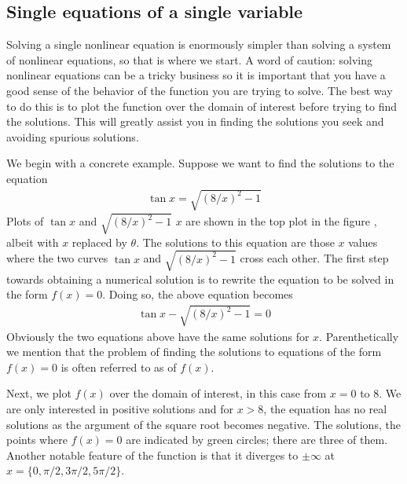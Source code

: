 \documentclass[letterpaper,10pt,english]{sphinxmanual}
\begin{document}
\subsection{Single equations of a single variable}
\label{\detokenize{chap9/chap9_scipy:single-equations-of-a-single-variable}}
\sphinxAtStartPar
Solving a single nonlinear equation is enormously simpler than solving a system of nonlinear equations, so that is where we start.  A word of caution: solving non\sphinxhyphen{}linear equations can be a tricky business so it is important that you have a good sense of the behavior of the function you are trying to solve.  The best way to do this is to plot the function over the domain of interest before trying to find the solutions.  This will greatly assist you in finding the solutions you seek and avoiding spurious solutions.

\sphinxAtStartPar
We begin with a concrete example.  Suppose we want to find the solutions to the equation
\begin{equation*}
\begin{split}\tan x=\sqrt{(8/x)^2-1}\end{split}
\end{equation*}
\sphinxAtStartPar
Plots of \(\tan x\) and \(\sqrt{(8/x)^2-1}\)  \(x\) are shown in the top plot in the figure {\hyperref[\detokenize{chap5/chap5_plot:fig-subplotdemo}]{}}, albeit with \(x\) replaced by \(\theta\).  The solutions to this equation are those \(x\) values where the two curves \(\tan x\) and \(\sqrt{(8/x)^2-1}\) cross each other. The first step towards obtaining a numerical solution is to rewrite the equation to be solved in the form \(f(x)=0\).  Doing so, the above equation becomes
\begin{equation*}
\begin{split}\tan x - \sqrt{(8/x)^2-1} = 0\end{split}
\end{equation*}
\sphinxAtStartPar
Obviously the two equations above have the same solutions for \(x\).  Parenthetically we mention that the problem of finding the solutions to equations of the form \(f(x)=0\) is often referred to as  of \(f(x)\).

\sphinxAtStartPar
Next, we plot \(f(x)\) over the domain of interest, in this case from \(x=0\) to 8.  We are only interested in positive solutions and for \(x>8\), the equation has no real solutions as the argument of the square root becomes negative.  The solutions, the points where \(f(x)=0\) are indicated by green circles; there are three of them. Another notable feature of the function is that it diverges to \(\pm\infty\) at \(x = \{0, \pi/2, 3\pi/2, 5\pi/2\}\).
\end{document}
